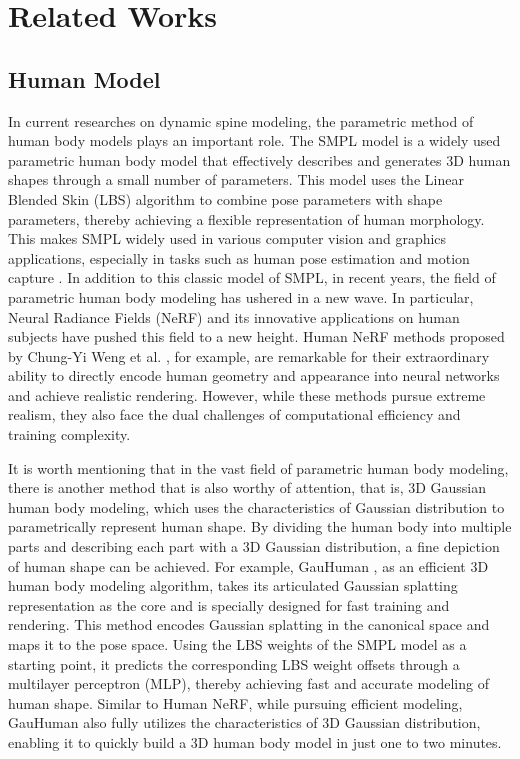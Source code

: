 \section{Related Works}
\label{Sec:related}
\subsection{Human Model}
In current researches on dynamic spine modeling, the parametric method of human body models plays an important role. The SMPL model is a widely used parametric human body model that effectively describes and generates 3D human shapes through a small number of parameters. This model uses the Linear Blended Skin (LBS) algorithm to combine pose parameters with shape parameters, thereby achieving a flexible representation of human morphology. This makes SMPL widely used in various computer vision and graphics applications, especially in tasks such as human pose estimation and motion capture \cite{loper2023smpl}.
In addition to this classic model of SMPL, in recent years, the field of parametric human body modeling has ushered in a new wave. In particular, Neural Radiance Fields (NeRF) \cite{mildenhall2021nerf} and its innovative applications on human subjects have pushed this field to a new height. Human NeRF methods proposed by Chung-Yi Weng et al. \cite{weng2022humannerf}, for example, are remarkable for their extraordinary ability to directly encode human geometry and appearance into neural networks and achieve realistic rendering. However, while these methods pursue extreme realism, they also face the dual challenges of computational efficiency and training complexity.
\par It is worth mentioning that in the vast field of parametric human body modeling, there is another method that is also worthy of attention, that is, 3D Gaussian human body modeling, which uses the characteristics of Gaussian distribution to parametrically represent human shape. By dividing the human body into multiple parts and describing each part with a 3D Gaussian distribution, a fine depiction of human shape can be achieved. For example, GauHuman \cite{hu2024gauhuman}, as an efficient 3D human body modeling algorithm, takes its articulated Gaussian splatting representation as the core and is specially designed for fast training and rendering. This method encodes Gaussian splatting in the canonical space and maps it to the pose space. Using the LBS weights of the SMPL model as a starting point, it predicts the corresponding LBS weight offsets through a multilayer perceptron (MLP), thereby achieving fast and accurate modeling of human shape. Similar to Human NeRF, while pursuing efficient modeling, GauHuman also fully utilizes the characteristics of 3D Gaussian distribution, enabling it to quickly build a 3D human body model in just one to two minutes.

